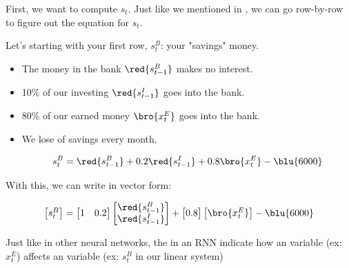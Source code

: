         \subsecdiv

        First, we want to compute $s_t$. Just like we mentioned in , we can go row-by-row to figure out the equation for $s_t$.
        
        Let's starting with your first row, $s_t^{B}$: your "savings" money.

        \begin{itemize}
            
            \item The money in the bank $\red{s^{B}_{t-1}}$ makes no interest. 
            \item 10\% of our investing $\red{s^{I}_{t-1}}$ goes into the bank.
            \item 80\% of our earned money $\bro{x_{t}^{E}}$ goes into the bank.
            \item We lose  of savings every month.

            \begin{equation}
                s_t^{B} =  \red{s^{B}_{t-1}} + 0.2\red{s^{I}_{t-1}} + 0.8\bro{x_{t}^{E}} - \blu{6000}
            \end{equation}
            
        \end{itemize}

        With this, we can write in vector form:

        \begin{equation}
            \begin{bmatrix}s_t^{B}\end{bmatrix} = 
            \begin{bmatrix}
                1 & 0.2
            \end{bmatrix}
            \begin{bmatrix}
                \red{s^{B}_{t-1}} \\ \red{s^{I}_{t-1}}
            \end{bmatrix}
            +
            \begin{bmatrix}0.8\end{bmatrix}
            \begin{bmatrix}\bro{x_{t}^{E}}\end{bmatrix}
            - \blu{6000}
        \end{equation}

        \begin{concept}
            Just like in other neural networks, the  in an RNN indicate how an  variable (ex: $x_t^E$) affects an  variable (ex: $s_t^B$ in our linear system)
        \end{concept}

